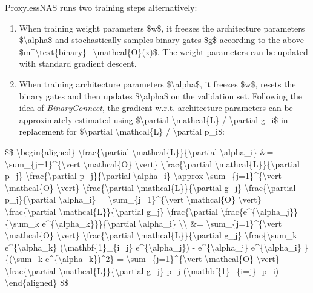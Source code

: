 ProxylessNAS runs two training steps alternatively:

\begin{enumerate}
\tightlist
\item
  When training weight parameters \$w\$, it freezes the architecture parameters \$\textbackslash alpha\$ and stochastically samples binary gates \$g\$ according to the above \$m\^{}\textbackslash text\{binary\}\_\textbackslash mathcal\{O\}(x)\$. The weight parameters can be updated with standard gradient descent.
\item
  When training architecture parameters \$\textbackslash alpha\$, it freezes \$w\$, resets the binary gates and then updates \$\textbackslash alpha\$ on the validation set. Following the idea of \emph{BinaryConnect}, the gradient w.r.t. architecture parameters can be approximately estimated using \$\textbackslash partial \textbackslash mathcal\{L\} / \textbackslash partial g\_i\$ in replacement for \$\textbackslash partial \textbackslash mathcal\{L\} / \textbackslash partial p\_i\$:
\end{enumerate}

\$\$ \textbackslash begin\{aligned\} \textbackslash frac\{\textbackslash partial \textbackslash mathcal\{L\}\}\{\textbackslash partial \textbackslash alpha\_i\} \&= \textbackslash sum\_\{j=1\}\^{}\{\textbackslash vert \textbackslash mathcal\{O\} \textbackslash vert\} \textbackslash frac\{\textbackslash partial \textbackslash mathcal\{L\}\}\{\textbackslash partial p\_j\} \textbackslash frac\{\textbackslash partial p\_j\}\{\textbackslash partial \textbackslash alpha\_i\} \textbackslash approx \textbackslash sum\_\{j=1\}\^{}\{\textbackslash vert \textbackslash mathcal\{O\} \textbackslash vert\} \textbackslash frac\{\textbackslash partial \textbackslash mathcal\{L\}\}\{\textbackslash partial g\_j\} \textbackslash frac\{\textbackslash partial p\_j\}\{\textbackslash partial \textbackslash alpha\_i\} = \textbackslash sum\_\{j=1\}\^{}\{\textbackslash vert \textbackslash mathcal\{O\} \textbackslash vert\} \textbackslash frac\{\textbackslash partial \textbackslash mathcal\{L\}\}\{\textbackslash partial g\_j\} \textbackslash frac\{\textbackslash partial \textbackslash frac\{e\^{}\{\textbackslash alpha\_j\}\}\{\textbackslash sum\_k e\^{}\{\textbackslash alpha\_k\}\}\}\{\textbackslash partial \textbackslash alpha\_i\} \textbackslash\textbackslash{} \&= \textbackslash sum\_\{j=1\}\^{}\{\textbackslash vert \textbackslash mathcal\{O\} \textbackslash vert\} \textbackslash frac\{\textbackslash partial \textbackslash mathcal\{L\}\}\{\textbackslash partial g\_j\} \textbackslash frac\{\textbackslash sum\_k e\^{}\{\textbackslash alpha\_k\} (\textbackslash mathbf\{1\}\_\{i=j\} e\^{}\{\textbackslash alpha\_j\}) - e\^{}\{\textbackslash alpha\_j\} e\^{}\{\textbackslash alpha\_i\} \}\{(\textbackslash sum\_k e\^{}\{\textbackslash alpha\_k\})\^{}2\} = \textbackslash sum\_\{j=1\}\^{}\{\textbackslash vert \textbackslash mathcal\{O\} \textbackslash vert\} \textbackslash frac\{\textbackslash partial \textbackslash mathcal\{L\}\}\{\textbackslash partial g\_j\} p\_j (\textbackslash mathbf\{1\}\_\{i=j\} -p\_i) \textbackslash end\{aligned\} \$\$

